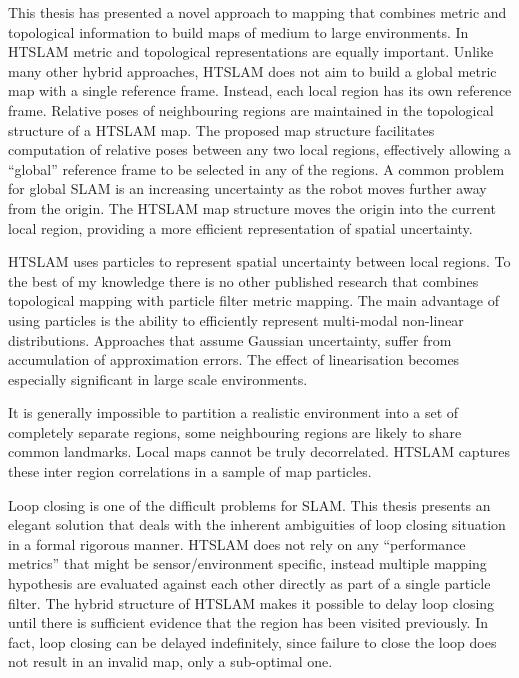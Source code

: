 This thesis has presented a novel approach to mapping that combines
metric and topological information to build maps of medium to large
environments. In HTSLAM metric and topological representations are
equally important. Unlike many other hybrid approaches, HTSLAM does
not aim to build a global metric map with a single reference
frame. Instead, each local region has its own reference
frame. Relative poses of neighbouring regions are maintained in the
topological structure of a HTSLAM map. The proposed map structure
facilitates computation of relative poses between any two local
regions, effectively allowing a ``global'' reference frame to be
selected in any of the regions. A common problem for global SLAM is an
increasing uncertainty as the robot moves further away from the
origin. The HTSLAM map structure moves the origin into the current local
region, providing a more efficient representation of spatial
uncertainty.

HTSLAM uses particles to represent spatial uncertainty between local
regions. To the best of my knowledge there is no other published
research that combines topological mapping with particle filter metric
mapping. The main advantage of using particles is the ability to
efficiently represent multi-modal non-linear distributions. Approaches
that assume Gaussian uncertainty, suffer from accumulation of
approximation errors. The effect of linearisation becomes especially
significant in large scale environments. 

It is generally impossible to partition a realistic environment into a
set of completely separate regions, some neighbouring regions are
likely to share common landmarks. Local maps cannot be truly
decorrelated. HTSLAM captures these inter region correlations in a
sample of map particles.

Loop closing is one of the difficult problems for SLAM. This thesis
presents an elegant solution that deals with the inherent ambiguities
of loop closing situation in a formal rigorous manner. HTSLAM does not
rely on any ``performance metrics'' that might be sensor/environment
specific, instead multiple mapping hypothesis are evaluated against
each other directly as part of a single particle filter. The hybrid
structure of HTSLAM makes it possible to delay loop closing until
there is sufficient evidence that the region has been visited
previously. In fact, loop closing can be delayed indefinitely, since
failure to close the loop does not result in an invalid map, only a
sub-optimal one.

